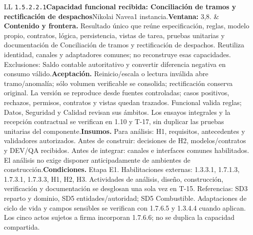 \begin{longtable}{L{\tabcolsep\relax}L{\tabcolsep\relax}}
\texttt{1.\allowbreak{}5.\allowbreak{}2.\allowbreak{}2.\allowbreak{}1}\newline{}\textbf{Capacidad funcional recibida: Conciliación de tramos y rectificación de despachos}\newline{}Nikolai Navea\newline{}1 instancia.\newline{}\textbf{Ventana:} 3,8. & \textbf{Contenido y frontera.} Resultado único que reúne especificación, reglas, modelo propio, contratos, lógica, persistencia, vistas de tarea, pruebas unitarias y documentación de Conciliación de tramos y rectificación de despachos. Reutiliza identidad, canales y adaptadores comunes; no reconstruye esas capacidades. Exclusiones: Saldo contable autoritativo y convertir diferencia negativa en consumo válido.\newline{}\textbf{Aceptación.} Reinicio/escala o lectura inválida abre tramo/anomalía; sólo volumen verificable se consolida; rectificación conserva original. La versión se reproduce desde fuentes controladas; casos positivos, rechazos, permisos, contratos y vistas quedan trazados. Funcional valida reglas; Datos, Seguridad y Calidad revisan sus ámbitos. Los ensayos integrales y la recepción contractual se verifican en 1.10 y T-17, sin duplicar las pruebas unitarias del componente.\newline{}\textbf{Insumos.} Para análisis: H1, requisitos, antecedentes y validadores autorizados. Antes de construir: decisiones de H2, modelos/contratos y DEV/QA recibidos. Antes de integrar: canales e interfaces comunes habilitados. El análisis no exige disponer anticipadamente de ambientes de construcción.\newline{}\textbf{Condiciones.} Etapa E1. Habilitaciones externas: 1.3.3.1, 1.7.1.3, 1.7.3.1, 1.7.3.3, H1, H2, H3. Actividades de análisis, diseño, construcción, verificación y documentación se desglosan una sola vez en T-15. Referencias: SD3 reparto y dominio, SD5 entidades/autoridad; SD5 Combustible. Adaptaciones de ciclo de vida y campos sensibles se verifican con 1.7.6.5 y 1.3.4.4 cuando aplican. Los cinco actos sujetos a firma incorporan 1.7.6.6; no se duplica la capacidad compartida.\\\hline

\end{longtable}
